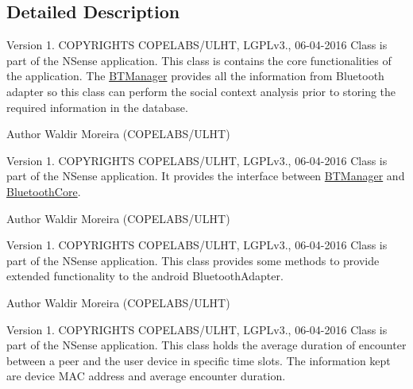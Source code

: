 \subsection{Detailed Description}
\begin{DoxyVersion}{Version}
1. C\-O\-P\-Y\-R\-I\-G\-H\-T\-S C\-O\-P\-E\-L\-A\-B\-S/\-U\-L\-H\-T, L\-G\-P\-Lv3., 06-\/04-\/2016 Class is part of the N\-Sense application. This class is contains the core functionalities of the application. The \hyperlink{classcs_1_1nsense_1_1bluetooth_1_1_b_t_manager}{B\-T\-Manager} provides all the information from Bluetooth adapter so this class can perform the social context analysis prior to storing the required information in the database. 
\end{DoxyVersion}
\begin{DoxyAuthor}{Author}
Waldir Moreira (C\-O\-P\-E\-L\-A\-B\-S/\-U\-L\-H\-T)
\end{DoxyAuthor}
\begin{DoxyVersion}{Version}
1. C\-O\-P\-Y\-R\-I\-G\-H\-T\-S C\-O\-P\-E\-L\-A\-B\-S/\-U\-L\-H\-T, L\-G\-P\-Lv3., 06-\/04-\/2016 Class is part of the N\-Sense application. It provides the interface between \hyperlink{classcs_1_1nsense_1_1bluetooth_1_1_b_t_manager}{B\-T\-Manager} and \hyperlink{classcs_1_1nsense_1_1bluetooth_1_1_bluetooth_core}{Bluetooth\-Core}. 
\end{DoxyVersion}
\begin{DoxyAuthor}{Author}
Waldir Moreira (C\-O\-P\-E\-L\-A\-B\-S/\-U\-L\-H\-T)
\end{DoxyAuthor}
\begin{DoxyVersion}{Version}
1. C\-O\-P\-Y\-R\-I\-G\-H\-T\-S C\-O\-P\-E\-L\-A\-B\-S/\-U\-L\-H\-T, L\-G\-P\-Lv3., 06-\/04-\/2016 Class is part of the N\-Sense application. This class provides some methods to provide extended functionality to the android Bluetooth\-Adapter. 
\end{DoxyVersion}
\begin{DoxyAuthor}{Author}
Waldir Moreira (C\-O\-P\-E\-L\-A\-B\-S/\-U\-L\-H\-T)
\end{DoxyAuthor}
\begin{DoxyVersion}{Version}
1. C\-O\-P\-Y\-R\-I\-G\-H\-T\-S C\-O\-P\-E\-L\-A\-B\-S/\-U\-L\-H\-T, L\-G\-P\-Lv3., 06-\/04-\/2016 Class is part of the N\-Sense application. This class holds the average duration of encounter between a peer and the user device in specific time slots. The information kept are device M\-A\-C address and average encounter duration. 
\end{DoxyVersion}

